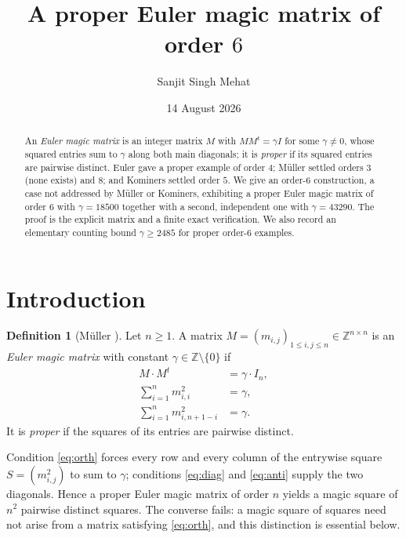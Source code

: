 \documentclass[11pt]{amsart}
\theoremstyle{plain}
\theoremstyle{definition}
\newtheorem{definition}[theorem]{Definition}
\newcommand{\Z}{\mathbb{Z}}
\begin{document}
\title{A proper Euler magic matrix of order $6$}
\author{Sanjit Singh Mehat}
\date{14 August 2026}

\begin{abstract}
An \emph{Euler magic matrix} is an integer matrix $M$ with $MM^{t}=\gamma I$ for
some $\gamma\neq 0$, whose squared entries sum to $\gamma$ along both main
diagonals; it is \emph{proper} if its squared entries are pairwise distinct.
Euler gave a proper example of order $4$; M\"uller settled orders $3$ (none
exists) and $8$; and Kominers settled order $5$. We give an order-$6$
construction, a case not addressed by M\"uller or Kominers, exhibiting a proper
Euler magic matrix of order $6$ with $\gamma=18500$ together with a second,
independent one with $\gamma=43290$. The proof is the explicit
matrix and a finite exact verification. We also record an elementary counting
bound $\gamma\geq 2485$ for proper order-$6$ examples.
\end{abstract}

\maketitle

\section{Introduction}

\begin{definition}[{M\"uller \cite[Definition 1.1]{Muller2026}}]\label{def:emm}
Let $n\geq 1$. A matrix $M=(m_{i,j})_{1\leq i,j\leq n}\in\Z^{n\times n}$ is an
\emph{Euler magic matrix} with constant $\gamma\in\Z\setminus\{0\}$ if
\begin{align}
M\cdot M^{t} &= \gamma\cdot I_n, \label{eq:orth}\\
\textstyle\sum_{i=1}^{n} m_{i,i}^{2} &= \gamma, \label{eq:diag}\\
\textstyle\sum_{i=1}^{n} m_{i,n+1-i}^{2} &= \gamma. \label{eq:anti}
\end{align}
It is \emph{proper} if the squares of its entries are pairwise distinct.
\end{definition}

Condition \eqref{eq:orth} forces every row and every column of the entrywise
square $S=(m_{i,j}^2)$ to sum to $\gamma$; conditions \eqref{eq:diag} and
\eqref{eq:anti} supply the two diagonals. Hence a proper Euler magic matrix of
order $n$ yields a magic square of $n^2$ pairwise distinct squares. The converse
fails: a magic square of squares need not arise from a matrix satisfying
\eqref{eq:orth}, and this distinction is essential below.
\end{document}
